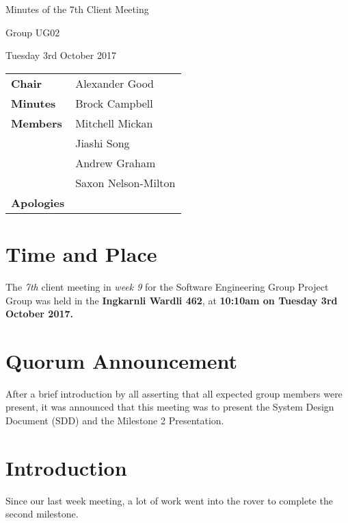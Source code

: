 \documentclass{article}
\begin{document}
\begin{center}    
{\huge Minutes of the 7th Client Meeting \par}
\vspace{0.5cm}
{\large Group UG02 \par}
\vspace{0.5cm}
{\large Tuesday 3rd October 2017 \par}
\vspace{0.5cm}
\end{center}

\begin{flushleft}
\begin{tabular}{ll}
{\bfseries Chair} & Alexander Good \\
{\bfseries Minutes} & Brock Campbell \\
{\bfseries Members} & Mitchell Mickan  \\
 & Jiashi Song \\ 
 & Andrew Graham \\
 & Saxon Nelson-Milton \\
{\bfseries Apologies}
\end{tabular}
\end{flushleft}

\section{Time and Place}
The {\itshape 7th} client meeting in {\itshape week 9} for the Software Engineering Group Project Group was held in the {\bfseries Ingkarnli Wardli 462}, at {\bfseries 10:10am on Tuesday 3rd October 2017.} 

\section{Quorum Announcement}
    After a brief introduction by all asserting that all expected group members were present, it was announced that this meeting was to present the System Design Document (SDD) and the Milestone 2 Presentation.

\section{Introduction}
  Since our last week meeting, a lot of work went into the rover to complete the second milestone.
\end{document}
